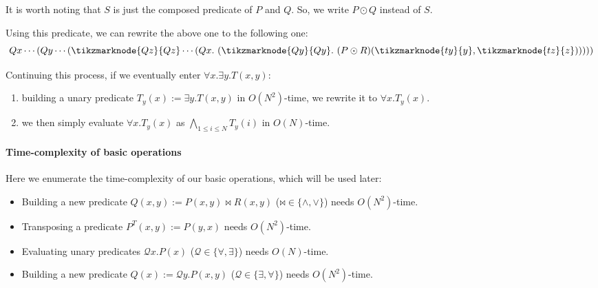 \documentclass[a4paper,UKenglish,cleveref, autoref, thm-restate]{lipics-v2021}
\newcommand{\set}[1]{\{ #1 \}}
\begin{document}
It is worth noting that $S$ is just the composed predicate of $P$ and $Q$.
So, we write $P \odot Q$ instead of $S$.

Using this predicate, we can rewrite the above one to the following one:
$$
Qx \cdots
( Qy \cdots
  ( \tikzmarknode{Qz}{Qz} \cdots
    ( Qx.\
      (
        \tikzmarknode{Qy}{Qy}.\ (P \odot R)(\tikzmarknode{ty}{y}, \tikzmarknode{tz}{z})
      )
    )
  )
)
$$


Continuing this process, if we eventually enter $\forall x. \exists y. T(x, y)$:
\begin{enumerate}
\item building a unary predicate $T_y(x) := \exists y. T(x, y)$ in $O(N^2)$-time, we rewrite it to $\forall x. T_y(x)$.
\item we then simply evaluate $\forall x. T_y(x)$ as $\bigwedge_{1 \leq i \leq N} T_y(i)$ in $O(N)$-time.
\end{enumerate}

\paragraph*{Time-complexity of basic operations}

Here we enumerate the time-complexity of our basic operations, which will be used later:
\begin{itemize}
\item Building a new predicate $Q(x, y) := P(x, y) \bowtie R(x, y)$ ($\mathord{\bowtie} \in \set{ \land, \lor }$) needs $O(N^2)$-time.
%
\item Transposing a predicate $P^T(x, y) := P(y, x)$ needs $O(N^2)$-time.
%
\item Evaluating unary predicates $\mathcal{Q} x. P(x)$ ($\mathcal{Q} \in \set{\forall, \exists}$) needs $O(N)$-time.
%
\item Building a new predicate $Q(x) := \mathcal{Q} y. P(x, y)$ ($\mathcal{Q} \in \set{\exists, \forall}$) needs $O(N^2)$-time.
\end{itemize}
\end{document}
